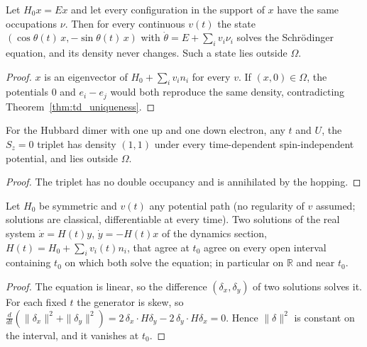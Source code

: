 \begin{theorem}
  \label{thm:frozen}
  \leanok
  Let $H_0x=Ex$ and let every configuration in the support of $x$ have the same occupations $\nu$. Then for every
  continuous $v(t)$ the state $(\cos\theta(t)\,x,-\sin\theta(t)\,x)$ with $\dot\theta=E+\sum_iv_i\nu_i$ solves the
  Schr\"odinger equation, and its density never changes. Such a state lies outside $\Omega$.
\end{theorem}
\begin{proof}
  \leanok
  $x$ is an eigenvector of $H_0+\sum_iv_in_i$ for every $v$. If $(x,0)\in\Omega$, the potentials $0$ and
  $e_i-e_j$ would both reproduce the same density, contradicting Theorem~\ref{thm:td_uniqueness}.
\end{proof}

\begin{theorem}
  \label{thm:frozen_triplet}
  \leanok
  For the Hubbard dimer with one up and one down electron, any $t$ and $U$, the $S_z=0$ triplet has density $(1,1)$
  under every time-dependent spin-independent potential, and lies outside $\Omega$.
\end{theorem}
\begin{proof}
  \leanok
  The triplet has no double occupancy and is annihilated by the hopping.
\end{proof}

\begin{theorem}
  \label{thm:schr_unique}
  \leanok
  Let $H_0$ be symmetric and $v(t)$ any potential path (no regularity of $v$ assumed; solutions are classical,
  differentiable at every time). Two solutions of the real system $\dot x=H(t)y$, $\dot y=-H(t)x$ of the dynamics
  section, $H(t)=H_0+\sum_iv_i(t)n_i$, that agree at $t_0$ agree on every open interval containing $t_0$ on which
  both solve the equation; in particular on $\mathbb R$ and near $t_0$.
\end{theorem}
\begin{proof}
  \leanok
  The equation is linear, so the difference $(\delta_x,\delta_y)$ of two solutions solves it. For each fixed $t$
  the generator is skew, so $\frac{d}{dt}(\|\delta_x\|^2+\|\delta_y\|^2)=2\,\delta_x\cdot H\delta_y
  -2\,\delta_y\cdot H\delta_x=0$. Hence $\|\delta\|^2$ is
  constant on the interval, and it vanishes at $t_0$.
\end{proof}

